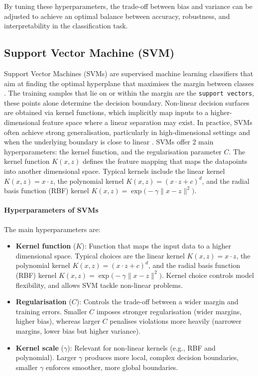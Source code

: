 By tuning these hyperparameters, the trade-off between bias and variance can be adjusted to achieve an optimal balance between accuracy, robustness, and interpretability in the classification task.

\subsection{Support Vector Machine (SVM)}\label{subsec:method-svm}
Support Vector Machines (SVMs) are supervised machine learning classifiers that aim at finding the optimal hyperplane that maximises the margin between classes \citep{Cortes1995}. The training samples that lie on or within the margin are the \texttt{support vectors}, these points alone determine the decision boundary. Non-linear decision surfaces are obtained via kernel functions, which implicitly map inputs to a higher-dimensional feature space where a linear separation may exist. In practice, SVMs often achieve strong generalisation, particularly in high-dimensional settings and when the underlying boundary is close to linear \citep{chang2011guide}.
SVMs offer 2 main hyperparameters: the kernel function, and the regularisation parameter $C$. The kernel function $K(x,z)$ defines the feature mapping that maps the datapoints into another dimensional space. Typical kernels include the linear kernel $K(x,z)=x \cdot z$, the polynomial kernel $K(x,z)=(x \cdot z + c)^d$, and the radial basis function (RBF) kernel $K(x,z)=\exp\!\big(-\gamma \lVert x-z\rVert^2\big)$.

\paragraph{Hyperparameters of SVMs}
The main hyperparameters are:
\begin{itemize}
    \item \textbf{Kernel function} ($K$): Function that maps the input data to a higher dimensional space. Typical choices are the linear kernel $K(x,z)=x \cdot z$, the polynomial kernel $K(x,z)=(x \cdot z + c)^d$, and the radial basis function (RBF) kernel $K(x,z)=\exp\!\big(-\gamma \lVert x-z\rVert^2\big)$. Kernel choice controls model flexibility, and allows SVM tackle non-linear problems.
    \item \textbf{Regularisation} ($C$): Controls the trade-off between a wider margin and training errors. Smaller $C$ imposes stronger regularisation (wider margins, higher bias), whereas larger $C$ penalises violations more heavily (narrower margins, lower bias but higher variance).
    \item \textbf{Kernel scale} ($\gamma$): Relevant for non-linear kernels (e.g., RBF and polynomial). Larger $\gamma$ produces more local, complex decision boundaries, smaller $\gamma$ enforces smoother, more global boundaries.
\end{itemize}

